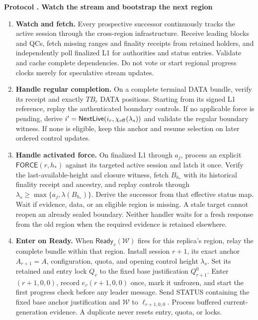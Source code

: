 \documentclass[11pt,a4paper]{article}
\newcommand{\tagg}[1]{\ensuremath{\mathsf{#1}}}
\newcounter{protocol}
\newenvironment{protocol}[2]{\refstepcounter{protocol}\label{#1}
\begin{mdframed}[nobreak=true,linewidth=.6pt,skipabove=8pt,skipbelow=8pt,
innertopmargin=7pt,innerbottommargin=7pt]\small
\textbf{Protocol \theprotocol. #2}\par\smallskip}{\end{mdframed}}
\begin{document}
\begin{protocol}{alg:bootstrap}{Watch the stream and bootstrap the next region}
\color{rrRed}
\begin{enumerate}[label=\textbf{\arabic*)},itemsep=5pt]
\item \textbf{Watch and fetch.} Every prospective successor continuously
tracks the active session through the cross-region infrastructure.
Receive leading blocks and QCs, fetch missing ranges and finality receipts
from retained holders, and independently poll finalized L1 for authorities
and status entries. Validate and cache complete dependencies. Do not vote
or start regional progress clocks merely for speculative stream updates.

\item \textbf{Handle regular completion.} On a complete terminal DATA
bundle, verify its receipt and exactly $TB_r$ DATA positions. Starting
from its signed L1 reference, replay the authenticated boundary controls.
If no applicable force is pending, derive
$i'=\tagg{NextLive}(i_r,\chi_{\rm eff}(\lambda_s))$ and validate the
regular boundary witness. If none is eligible, keep this anchor and
resume selection on later ordered control updates.

\item \textbf{Handle activated force.} On finalized L1 through $a_j$,
process an explicit $\tagg{FORCE}(r,h_*)$ against its targeted active
session and latch it once. Verify the last-available-height and closure
witness, fetch $B_{h_*}$ with its historical finality receipt and ancestry,
and replay controls through $\lambda_s\ge\max\{a_j,\lambda(B_{h_*})\}$.
Derive the successor from that effective status map. Wait if evidence,
data, or an eligible region is missing. A stale target cannot reopen an
already sealed boundary. Neither handler waits for a fresh response from
the old region when the required evidence is retained elsewhere.

\item \textbf{Enter on Ready.} When $\tagg{Ready}_v(\mathcal W)$ fires
for this replica's region, relay the complete bundle within that region.
Install session $r+1$, its exact anchor $A_{r+1}=A$, configuration, quota,
and opening control height $\lambda_s$. Set its retained and entry lock
$Q_v$ to the fixed base justification $Q_{r+1}^0$. Enter $(r+1,0,0)$, record
$e_v(r+1,0,0)$ once, mark it unfrozen, and start the first progress check
before any leader message. Send STATUS containing the fixed base anchor
justification and $\mathcal W$ to $\ell_{r+1,0,0}$. Process buffered
current-generation evidence. A duplicate never resets entry, quota, or locks.


\end{enumerate}
\end{protocol}
\end{document}
